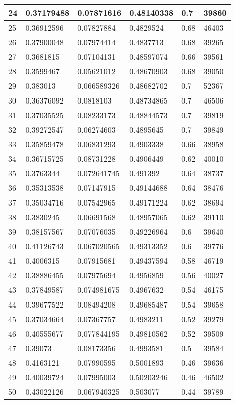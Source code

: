 \begin{longtable}{|l|l|l|l|l|l|}
24 & 0.37179488 & 0.07871616 & 0.48140338 & 0.7 & 39860 \\ \hline 
25 & 0.36912596 & 0.07827884 & 0.4829524 & 0.68 & 46403 \\ \hline 
26 & 0.37900048 & 0.07974414 & 0.4837713 & 0.68 & 39265 \\ \hline 
27 & 0.3681815 & 0.07104131 & 0.48597074 & 0.66 & 39561 \\ \hline 
28 & 0.3599467 & 0.05621012 & 0.48670903 & 0.68 & 39050 \\ \hline 
29 & 0.383013 & 0.066589326 & 0.48682702 & 0.7 & 52367 \\ \hline 
30 & 0.36376092 & 0.0818103 & 0.48734865 & 0.7 & 46506 \\ \hline 
31 & 0.37035525 & 0.08233173 & 0.48844573 & 0.7 & 39819 \\ \hline 
32 & 0.39272547 & 0.06274603 & 0.4895645 & 0.7 & 39849 \\ \hline 
33 & 0.35859478 & 0.06831293 & 0.4903338 & 0.66 & 38958 \\ \hline 
34 & 0.36715725 & 0.08731228 & 0.4906449 & 0.62 & 40010 \\ \hline 
35 & 0.3763344 & 0.072641745 & 0.491392 & 0.64 & 38737 \\ \hline 
36 & 0.35313538 & 0.07147915 & 0.49144688 & 0.64 & 38476 \\ \hline 
37 & 0.35034716 & 0.07542965 & 0.49171224 & 0.62 & 38694 \\ \hline 
38 & 0.3830245 & 0.06691568 & 0.48957065 & 0.62 & 39110 \\ \hline 
39 & 0.38157567 & 0.07076035 & 0.49226964 & 0.6 & 39640 \\ \hline 
40 & 0.41126743 & 0.067020565 & 0.49313352 & 0.6 & 39776 \\ \hline 
41 & 0.4006315 & 0.07915681 & 0.49437594 & 0.58 & 46719 \\ \hline 
42 & 0.38886455 & 0.07975694 & 0.4956859 & 0.56 & 40027 \\ \hline 
43 & 0.37849587 & 0.074981675 & 0.4967632 & 0.54 & 46175 \\ \hline 
44 & 0.39677522 & 0.08494208 & 0.49685487 & 0.54 & 39658 \\ \hline 
45 & 0.37034664 & 0.07367757 & 0.4983211 & 0.52 & 39279 \\ \hline 
46 & 0.40555677 & 0.077844195 & 0.49810562 & 0.52 & 39509 \\ \hline 
47 & 0.39073 & 0.08173356 & 0.4993581 & 0.5 & 39584 \\ \hline 
48 & 0.4163121 & 0.07990595 & 0.5001893 & 0.46 & 39636 \\ \hline 
49 & 0.40039724 & 0.07995003 & 0.50203246 & 0.46 & 46502 \\ \hline 
50 & 0.43022126 & 0.067940325 & 0.503077 & 0.44 & 39789 \\ \hline 
\end{longtable}